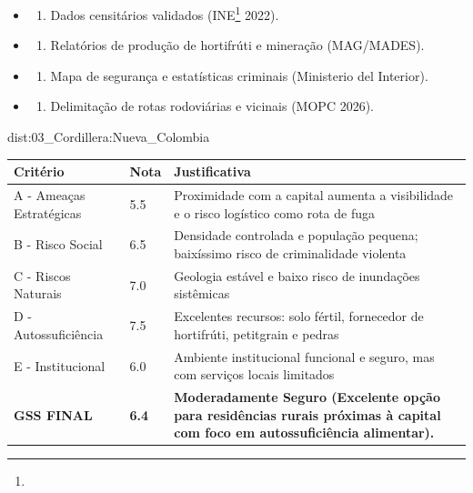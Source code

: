 {\begin{itemize}
\tightlist
\item
  \begin{enumerate}
  \def\labelenumi{\arabic{enumi})}
  \tightlist
  \item
    Dados censitários validados (INE\footnote{\fineINE} 2022).
  \end{enumerate}
\item
  \begin{enumerate}
  \def\labelenumi{\arabic{enumi})}
  \setcounter{enumi}{1}
  \tightlist
  \item
    Relatórios de produção de hortifrúti e mineração (MAG/\allowbreak MADES).
  \end{enumerate}
\item
  \begin{enumerate}
  \def\labelenumi{\arabic{enumi})}
  \setcounter{enumi}{2}
  \tightlist
  \item
    Mapa de segurança e estatísticas criminais (Ministerio del
    Interior).
  \end{enumerate}
\item
  \begin{enumerate}
  \def\labelenumi{\arabic{enumi})}
  \setcounter{enumi}{3}
  \tightlist
  \item
    Delimitação de rotas rodoviárias e vicinais (MOPC 2026).
  \end{enumerate}
\end{itemize}}{dist:03_Cordillera:Nueva_Colombia}
\begin{table}[ht!]
\small \begin{tabular}{p{3.0cm}p{0.8cm}p{6.0cm}} \toprule
\textbf{Critério} & \textbf{Nota} & \textbf{Justificativa} \\ \midrule
A - Ameaças Estratégicas & 5.5 & Proximidade com a capital aumenta a visibilidade e o risco logístico como rota de fuga \\
B - Risco Social & 6.5 & Densidade controlada e população pequena; baixíssimo risco de criminalidade violenta \\
C - Riscos Naturais & 7.0 & Geologia estável e baixo risco de inundações sistêmicas \\
D - Autossuficiência & 7.5 & Excelentes recursos: solo fértil, fornecedor de hortifrúti, petitgrain e pedras \\
E - Institucional & 6.0 & Ambiente institucional funcional e seguro, mas com serviços locais limitados \\
\midrule \textbf{GSS FINAL} & \textbf{6.4} & \textbf{Moderadamente Seguro (Excelente opção para residências rurais próximas à capital com foco em autossuficiência alimentar).} \\ \bottomrule \end{tabular}
\end{table}
